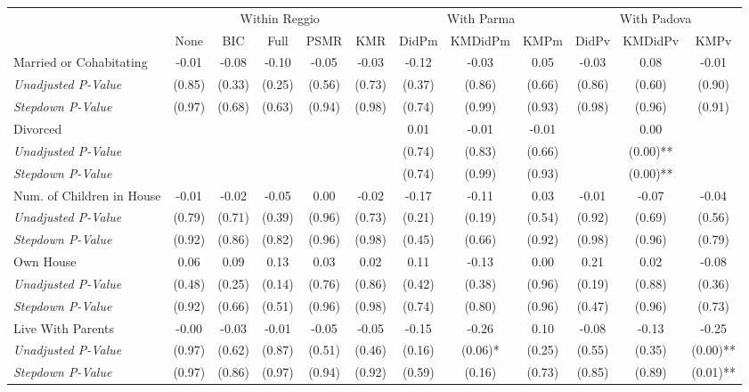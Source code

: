 \begin{tabular}{l c c c c c c c c c c c}
\toprule
& \multicolumn{5}{c}{Within Reggio} & \multicolumn{3}{c}{With Parma} & \multicolumn{3}{c}{With Padova} \\\cmidrule(lr){2-6} \cmidrule(lr){7-9} \cmidrule(lr){10-12}
 & None & BIC & Full & PSMR & KMR & DidPm & KMDidPm & KMPm & DidPv & KMDidPv & KMPv \\
\midrule
Married or Cohabitating & -0.01 & -0.08 & -0.10 & -0.05 & -0.03 & -0.12 & -0.03 & 0.05 & -0.03 & 0.08 & -0.01 \\
\quad \textit{Unadjusted P-Value} & (0.85) & (0.33) & (0.25) & (0.56) & (0.73) & (0.37) & (0.86) & (0.66) & (0.86) & (0.60) & (0.90) \\
\quad \textit{Stepdown P-Value} & (0.97) & (0.68) & (0.63) & (0.94) & (0.98) & (0.74) & (0.99) & (0.93) & (0.98) & (0.96) & (0.91) \\
Divorced &  &  &  &  &  & 0.01 & -0.01 & -0.01 &  & 0.00 &  \\
\quad \textit{Unadjusted P-Value} & & & & & & (0.74) & (0.83) & (0.66) & & (0.00)** & \\
\quad \textit{Stepdown P-Value} &  &  &  & & & (0.74) & (0.99) & (0.93) &  & (0.00)** &  \\
Num. of Children in House & -0.01 & -0.02 & -0.05 & 0.00 & -0.02 & -0.17 & -0.11 & 0.03 & -0.01 & -0.07 & -0.04 \\
\quad \textit{Unadjusted P-Value} & (0.79) & (0.71) & (0.39) & (0.96) & (0.73) & (0.21) & (0.19) & (0.54) & (0.92) & (0.69) & (0.56) \\
\quad \textit{Stepdown P-Value} & (0.92) & (0.86) & (0.82) & (0.96) & (0.98) & (0.45) & (0.66) & (0.92) & (0.98) & (0.96) & (0.79) \\
Own House & 0.06 & 0.09 & 0.13 & 0.03 & 0.02 & 0.11 & -0.13 & 0.00 & 0.21 & 0.02 & -0.08 \\
\quad \textit{Unadjusted P-Value} & (0.48) & (0.25) & (0.14) & (0.76) & (0.86) & (0.42) & (0.38) & (0.96) & (0.19) & (0.88) & (0.36) \\
\quad \textit{Stepdown P-Value} & (0.92) & (0.66) & (0.51) & (0.96) & (0.98) & (0.74) & (0.80) & (0.96) & (0.47) & (0.96) & (0.73) \\
Live With Parents & -0.00 & -0.03 & -0.01 & -0.05 & -0.05 & -0.15 & -0.26 & 0.10 & -0.08 & -0.13 & -0.25 \\
\quad \textit{Unadjusted P-Value} & (0.97) & (0.62) & (0.87) & (0.51) & (0.46) & (0.16) & (0.06)* & (0.25) & (0.55) & (0.35) & (0.00)** \\
\quad \textit{Stepdown P-Value} & (0.97) & (0.86) & (0.97) & (0.94) & (0.92) & (0.59) & (0.16) & (0.73) & (0.85) & (0.89) & (0.01)** \\
\bottomrule
\end{tabular}
